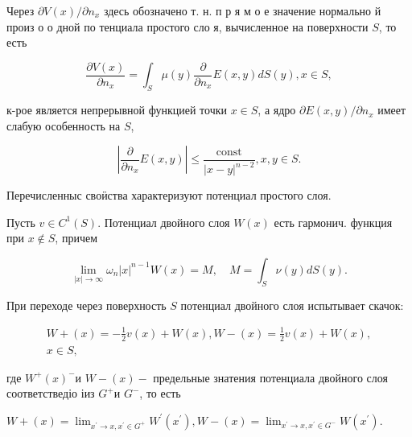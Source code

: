 \documentclass[10pt]{article}
\begin{document}
Через $\partial V(x) / \partial n_{x}$ здесь обозначено т. н. п р я м о е значение нормально й произ о о дной по тенциала простого сло я, вычисленное на поверхности $S$, то есть



\[

\frac{\partial V(x)}{\partial n_{x}}=\int_{S} \mu(y) \frac{\partial}{\partial n_{x}} E(x, y) d S(y), x \in S,

\]



к-рое является непрерывной функцией точки $x \in S$, а ядро $\partial E(x, y) / \partial n_{x}$ имеет слабую особенность на $S$,



\[

\left|\frac{\partial}{\partial n_{x}} E(x, y)\right| \leqslant \frac{\text { const }}{|x-y|^{n-2}}, x, y \in S .

\]



Перечисленныс своӥства характеризуют потенциал простого слоя.



Пусть $v \in C^{1}(S)$. Потенциал двойного слоя $W(x)$ есть гармонич. функция при $x \notin S$, причем



\[

\lim _{|x| \rightarrow \infty} \omega_{n}|x|^{n-1} W(x)=M, \quad M=\int_{S} \nu(y) d S(y) .

\]



При переходе через поверхность $S$ потенциал двойного слоя испытывает скачок:



\[

\begin{gathered}

W+(x)=-\frac{1}{2} v(x)+W(x), W-(x)=\frac{1}{2} v(x)+W(x), \\

x \in S,

\end{gathered}

\]



где $W^{+}(x)^{-}$и $W-(x)-$ предельные знатения потенциала двойного слоя соответстведіо іиз $G^{+}$и $G^{-}$, то есть



$W+(x)=\lim _{x^{\prime} \rightarrow x, x^{\prime} \in G^{+}} W^{\prime}\left(x^{\prime}\right), W-(x)=\lim _{x^{\prime} \rightarrow x, x^{\prime} \in G^{-}} W\left(x^{\prime}\right)$.
\end{document}
